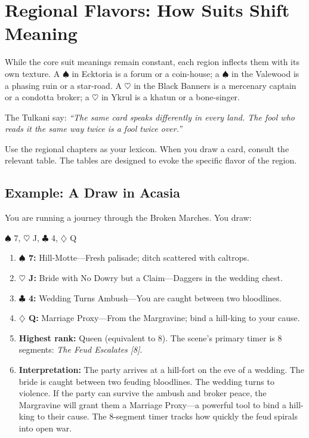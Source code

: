 \documentclass[11pt,letterpaper,twoside]{book}
\begin{document}
\section*{Regional Flavors: How Suits Shift Meaning}

While the core suit meanings remain constant, each region inflects them with its own texture. A $\spadesuit$ in Ecktoria is a forum or a coin-house; a $\spadesuit$ in the Valewood is a phasing ruin or a star-road. A $\heartsuit$ in the Black Banners is a mercenary captain or a condotta broker; a $\heartsuit$ in Ykrul is a khatun or a bone-singer.

The Tulkani say: \textit{``The same card speaks differently in every land. The fool who reads it the same way twice is a fool twice over.''}

Use the regional chapters as your lexicon. When you draw a card, consult the relevant table. The tables are designed to evoke the specific flavor of the region.

\subsection*{Example: A Draw in Acasia}

You are running a journey through the Broken Marches. You draw:

\begin{center}
$\spadesuit$ 7, \quad $\heartsuit$ J, \quad $\clubsuit$ 4, \quad $\diamondsuit$ Q
\end{center}

\begin{enumerate}
    \item \textbf{$\spadesuit$ 7:} Hill-Motte---Fresh palisade; ditch scattered with caltrops.
    \item \textbf{$\heartsuit$ J:} Bride with No Dowry but a Claim---Daggers in the wedding chest.
    \item \textbf{$\clubsuit$ 4:} Wedding Turns Ambush---You are caught between two bloodlines.
    \item \textbf{$\diamondsuit$ Q:} Marriage Proxy---From the Margravine; bind a hill-king to your cause.
    \item \textbf{Highest rank:} Queen (equivalent to 8). The scene's primary timer is 8 segments: \textit{The Feud Escalates [8]}.
    \item \textbf{Interpretation:} The party arrives at a hill-fort on the eve of a wedding. The bride is caught between two feuding bloodlines. The wedding turns to violence. If the party can survive the ambush and broker peace, the Margravine will grant them a Marriage Proxy---a powerful tool to bind a hill-king to their cause. The 8-segment timer tracks how quickly the feud spirals into open war.
\end{enumerate}
\end{document}
